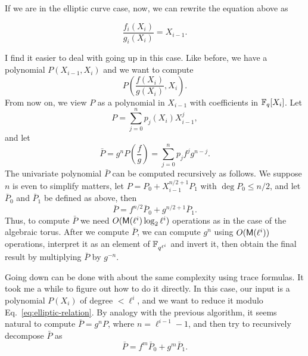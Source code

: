 \documentclass[11pt]{article}
\begin{document}
If we are in the elliptic curve case, now, we can rewrite the
equation above as

\begin{equation}
  \label{eq:elliptic-relation}
  \frac{f_i(X_i)}{g_i(X_i)} = X_{i-1}.
\end{equation}

I find it easier to deal with going up in this case. Like before, we
have a polynomial $P(X_{i-1},X_i)$ and we want to compute
\begin{equation}
  P\left(\frac{f(X_i)}{g(X_i)}, X_i\right).
\end{equation}
From now on, we view $P$ as a polynomial in $X_{i-1}$ with coefficients in
$\mathbb{F}_q[X_i]$. Let
\begin{equation}
  P = \sum_{j=0}^n p_j(X_i)X_{i-1}^j,
\end{equation}
and let
\begin{equation}
  \bar{P} = g^n P\left(\frac{f}{g}\right) =
  \sum_{j=0}^n p_jf^jg^{n-j}.
\end{equation}
The univariate polynomial $\bar{P}$ can be computed recursively as
follows. We suppose $n$ is even to simplify matters, let
$P=P_0+X_{i-1}^{n/2+1}P_1$ with $\deg P_0\le n/2$, and let $\bar{P}_0$
and $\bar{P}_1$ be defined as above, then
\begin{equation}
  \bar{P} = f^{n/2}\bar{P}_0 + g^{n/2+1}\bar{P}_1.
\end{equation}
Thus, to compute $\bar{P}$ we need $O(\mathsf{M}(\ell^i)\log_2\ell^i)$
operations as in the case of the algebraic torus. After we compute
$\bar{P}$, we can compute $g^n$ using $O(\mathsf{M}(\ell^i))$ operations,
interpret it as an element of $\mathbb{F}_{q^{\ell^i}}$ and invert it, then
obtain the final result by multiplying $\bar{P}$ by $g^{-n}$.

Going down can be done with about the same complexity using trace
formulas. It took me a while to figure out how to do it directly. In
this case, our input is a polynomial $P(X_i)$ of degree $<\ell^i$,
and we want to reduce it modulo Eq.~\eqref{eq:elliptic-relation}. By
analogy with the previous algorithm, it seems natural to compute
$\bar{P}=g^nP$, where $n=\ell^{i-1}-1$, and then try to recursively
decompose $\bar{P}$ as
\begin{equation}
  \bar{P} = f^{m}\bar{P}_0 + g^{m}\bar{P}_1.
\end{equation}
\end{document}
